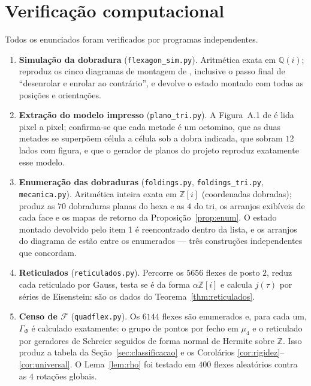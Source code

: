 \documentclass[11pt,a4paper]{article}
\theoremstyle{plain}
\theoremstyle{definition}
\theoremstyle{remark}
\newcommand{\Z}{\mathbb{Z}}
\newcommand{\Q}{\mathbb{Q}}
\newcommand{\Zi}{\Z[i]}
\newcommand{\FF}{\mathscr{F}}
\begin{document}
\section{Verificação computacional}\label{sec:computacional}

Todos os enunciados foram verificados por programas independentes.

\begin{enumerate}
\item \textbf{Simulação da dobradura} (\texttt{flexagon\_sim.py}). Aritmética
exata em $\Q(i)$; reproduz os cinco diagramas de montagem de
\cite[p.~5]{manual}, inclusive o passo final de ``desenrolar e enrolar ao
contrário'', e devolve o estado montado com todas as posições e orientações.

\item \textbf{Extração do modelo impresso} (\texttt{plano\_tri.py}). A
Figura~A.1 de \cite{manual} é lida pixel a pixel; confirma-se que cada metade é
um octomino, que as duas metades se superpõem célula a célula sob a dobra
indicada, que sobram $12$ lados com figura, e que o gerador de planos do projeto
reproduz exatamente esse modelo.

\item \textbf{Enumeração das dobraduras} (\texttt{foldings.py},
\texttt{foldings\_tri.py}, \texttt{mecanica.py}). Aritmética inteira exata em
$\Zi$ (coordenadas dobradas); produz as $70$ dobraduras planas do hexa e as $4$
do tri, os arranjos exibíveis de cada face e os mapas de retorno da
Proposição~\ref{prop:enum}. O estado montado devolvido pelo item 1 é
reencontrado dentro da lista, e os arranjos do diagrama de \cite{enimar} estão
entre os enumerados --- três construções independentes que concordam.

\item \textbf{Reticulados} (\texttt{reticulados.py}). Percorre os $5656$ flexes
de posto $2$, reduz cada reticulado por Gauss, testa se é da forma $\alpha\Zi$
e calcula $j(\tau)$ por séries de Eisenstein: são os dados do
Teorema~\ref{thm:reticulados}.

\item \textbf{Censo de $\FF$} (\texttt{quadflex.py}). Os $6144$ flexes são
enumerados e, para cada um, $\Gamma_\Phi$ é calculado exatamente: o grupo de
pontos por fecho em $\mu_4$ e o reticulado por geradores de Schreier seguidos
de forma normal de Hermite sobre $\Z$. Isso produz a tabela da
Seção~\ref{sec:classificacao} e os Corolários
\ref{cor:rigidez}--\ref{cor:universal}. O Lema~\ref{lem:rho} foi testado em
$400$ flexes aleatórios contra as $4$ rotações globais.


\end{enumerate}
\end{document}
